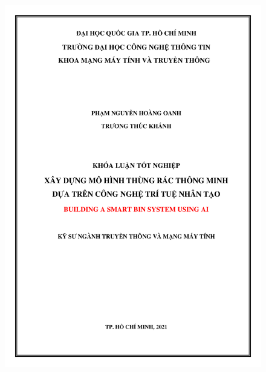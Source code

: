 \begin{figure}[H]
    \centering
    \includegraphics[width=\textwidth]{images/Main_Cover.jpg}
\end{figure}

